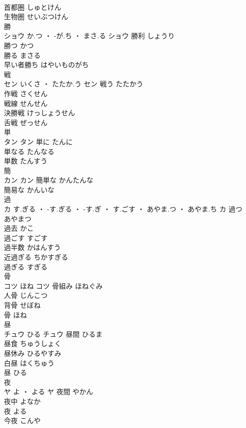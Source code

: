 \documentclass[8pt]{extreport}
\begin{document}
\begin{CJK}{UTF8}{min}
\\	首都圏	しゅとけん	
\\	生物圏	せいぶつけん	
\\	勝	
\\	ショウ	か.つ ・ -が.ち ・ まさ.る	ショウ	勝利	しょうり	
\\	勝つ	かつ	
\\	勝る	まさる	
\\	早い者勝ち	はやいものがち	
\\	戦	
\\	セン	いくさ ・ たたか.う	セン	戦う	たたかう	
\\	作戦	さくせん	
\\	戦線	せんせん	
\\	決勝戦	けっしょうせん	
\\	舌戦	ぜっせん	
\\	単	
\\	タン		タン	単に	たんに	
\\	単なる	たんなる	
\\	単数	たんすう	
\\	簡	
\\	カン		カン	簡単な	かんたんな	
\\	簡易な	かんいな	
\\	過	
\\	カ	す.ぎる ・ -す.ぎる ・ -す.ぎ ・ す.ごす ・ あやま.つ ・ あやま.ち	カ	過つ	あやまつ	
\\	過去	かこ	
\\	過ごす	すごす	
\\	過半数	かはんすう	
\\	近過ぎる	ちかすぎる	
\\	過ぎる	すぎる	
\\	骨	
\\	コツ	ほね	コツ	骨組み	ほねぐみ	
\\	人骨	じんこつ	
\\	背骨	せぼね	
\\	骨	ほね	
\\	昼	
\\	チュウ	ひる	チュウ	昼間	ひるま	
\\	昼食	ちゅうしょく	
\\	昼休み	ひるやすみ	
\\	白昼	はくちゅう	
\\	昼	ひる	
\\	夜	
\\	ヤ	よ ・ よる	ヤ	夜間	やかん	
\\	夜中	よなか	
\\	夜	よる	
\\	今夜	こんや	

\end{CJK}
\end{document}
